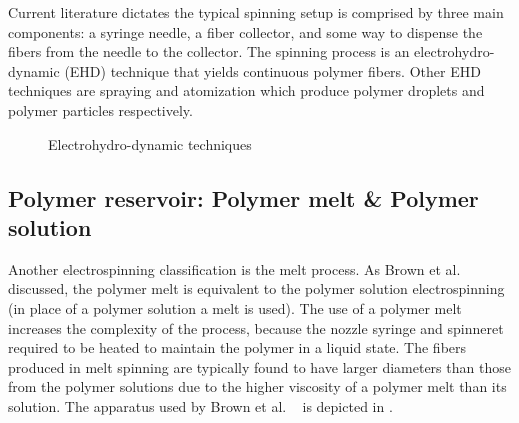 \documentclass[5p,,preprint,12pt,twocolumn]{elsarticle}
\makeatletter
\def\fixFloatSize#1{}%
\makeatother
\begin{document}
Current literature dictates the typical spinning setup is comprised by three main components: a syringe needle, a fiber collector, and some way to dispense the fibers from the needle to the collector. The spinning process is an electrohydro-dynamic (EHD) technique that yields continuous polymer fibers. Other EHD techniques are spraying and atomization which produce polymer droplets and polymer particles respectively.


\bgroup
\fixFloatSize{images/f10bcbc9-719b-4a8d-8a38-930cc6ea2d0f-uimg_ehdprocesses.jpg}
\begin{figure}[!htbp]
\centering \makeatletter{}
\makeatother 
\caption{{Electrohydro-dynamic techniques}}
\label{f-02e0e3cf88d6}
\end{figure}
\egroup




\subsection{Polymer reservoir: Polymer melt \& Polymer solution}Another electrospinning classification is the melt process. As Brown et al. \unskip~\cite{527120:13445499} discussed, the polymer melt is equivalent to the polymer solution electrospinning (in place of a polymer solution a melt is used). The use of a polymer melt increases the complexity of the process, because the nozzle syringe and spinneret required to be heated to maintain the polymer in a liquid state. The fibers produced in melt spinning are typically found to have larger diameters than those from the polymer solutions due to the higher viscosity of a polymer melt than its solution. The apparatus used by Brown et al. \unskip~\cite{527120:13445499} is depicted in .
\end{document}
